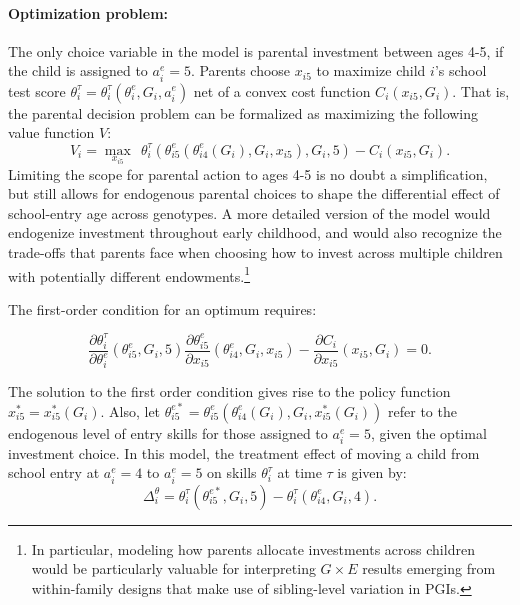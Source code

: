 \documentclass[12pt,a4paper]{article}
\begin{document}
\begin{bibunit}
\paragraph{Optimization problem:} The only choice variable in the model is parental investment between ages 4-5, if the child is assigned to $a_{i}^{e}=5$.  Parents choose $x_{i5}$ to maximize child $i$'s school test score $\theta_i^\tau = \theta_{i}^\tau(\theta_{i}^{e},G_{i},a_{i}^{e})$ net of a convex cost function $C_{i}(x_{i5},G_{i})$.  That is, the parental decision problem can be formalized as maximizing the following value function $V$:
\begin{equation}
V_{i} = \max_{x_{i5}}\:\:\theta_{i}^\tau\left(\theta^{e}_{i5}(\theta_{i4}^{e}(G_{i}),G_{i},x_{i5}),G_{i},5\right)-C_{i}(x_{i5},G_{i}).
\label{eq:valuefunction}
\end{equation}
Limiting the scope for parental action to ages 4-5 is no doubt a simplification, but still allows for endogenous parental choices to shape the differential effect of school-entry age across genotypes.  A more detailed version of the model would endogenize investment throughout early childhood, and would also recognize the trade-offs that parents face when choosing how to invest across multiple children with potentially different endowments.\footnote{In particular, modeling how parents allocate investments across children would be particularly valuable for interpreting $G\times{}E$ results emerging from within-family designs that make use of sibling-level variation in PGIs.}    

The first-order condition for an optimum requires:

\begin{equation}
    \frac{\partial \theta_{i}^\tau}{\partial \theta_{i}^{e}}(\theta_{i5}^{e},G_{i},5)\frac{\partial \theta_{i5}^{e}}{\partial x_{i5}}(\theta_{i4}^{e},G_{i},x_{i5})-\frac{\partial C_{i}}{\partial x_{i5}}(x_{i5},G_{i})=0.
    \label{eq:FOC}
\end{equation}

The solution to the first order condition gives rise to the policy function $x_{i5}^{*}=x_{i5}^{*}(G_{i})$.  Also, let $\theta_{i5}^{e*}=\theta_{i5}^{e}(\theta_{i4}^{e}(G_{i}),G_{i},x_{i5}^{*}(G_{i}))$ refer to the endogenous level of entry skills for those assigned to $a_{i}^{e}=5$, given the optimal investment choice. In this model, the treatment effect of moving a child from school entry at $a_{i}^{e}=4$ to $a_{i}^{e}=5$ on skills $\theta_{i}^{\tau}$ at time $\tau$ is given by:
\begin{equation}
\Delta_{i}^{\theta} = \theta_{i}^\tau(\theta^{e*}_{i5},G_{i},5)-\theta_{i}^\tau(\theta_{i4}^{e},G_{i},4).
\label{eq:delta}
\end{equation}


\end{bibunit}
\end{document}

